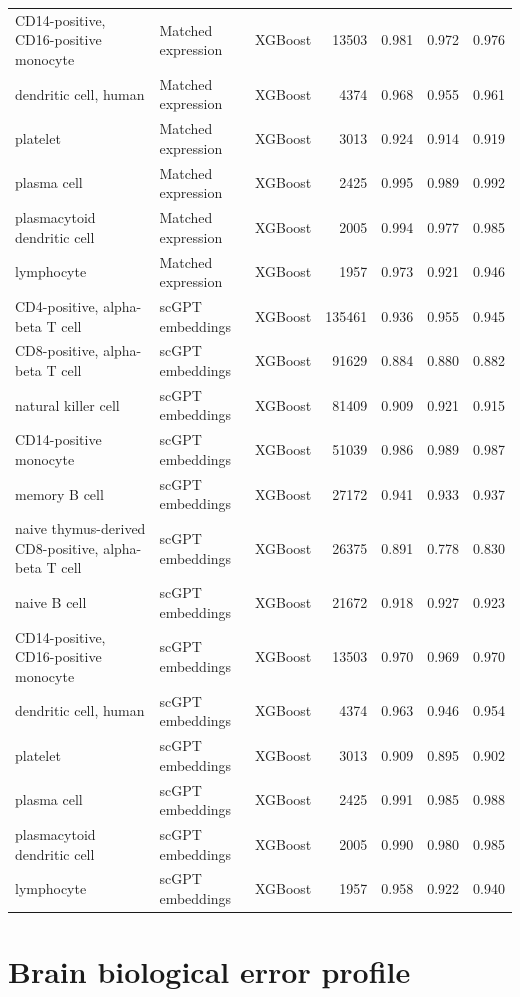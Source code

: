 {\begin{longtable}{>{\raggedright\arraybackslash}p{4.2cm}llrrrr}
CD14-positive, CD16-positive monocyte & Matched expression & XGBoost & 13503 & 0.981 & 0.972 & 0.976 \\
dendritic cell, human & Matched expression & XGBoost & 4374 & 0.968 & 0.955 & 0.961 \\
platelet & Matched expression & XGBoost & 3013 & 0.924 & 0.914 & 0.919 \\
plasma cell & Matched expression & XGBoost & 2425 & 0.995 & 0.989 & 0.992 \\
plasmacytoid dendritic cell & Matched expression & XGBoost & 2005 & 0.994 & 0.977 & 0.985 \\
lymphocyte & Matched expression & XGBoost & 1957 & 0.973 & 0.921 & 0.946 \\
CD4-positive, alpha-beta T cell & scGPT embeddings & XGBoost & 135461 & 0.936 & 0.955 & 0.945 \\
CD8-positive, alpha-beta T cell & scGPT embeddings & XGBoost & 91629 & 0.884 & 0.880 & 0.882 \\
natural killer cell & scGPT embeddings & XGBoost & 81409 & 0.909 & 0.921 & 0.915 \\
CD14-positive monocyte & scGPT embeddings & XGBoost & 51039 & 0.986 & 0.989 & 0.987 \\
memory B cell & scGPT embeddings & XGBoost & 27172 & 0.941 & 0.933 & 0.937 \\
naive thymus-derived CD8-positive, alpha-beta T cell & scGPT embeddings & XGBoost & 26375 & 0.891 & 0.778 & 0.830 \\
naive B cell & scGPT embeddings & XGBoost & 21672 & 0.918 & 0.927 & 0.923 \\
CD14-positive, CD16-positive monocyte & scGPT embeddings & XGBoost & 13503 & 0.970 & 0.969 & 0.970 \\
dendritic cell, human & scGPT embeddings & XGBoost & 4374 & 0.963 & 0.946 & 0.954 \\
platelet & scGPT embeddings & XGBoost & 3013 & 0.909 & 0.895 & 0.902 \\
plasma cell & scGPT embeddings & XGBoost & 2425 & 0.991 & 0.985 & 0.988 \\
plasmacytoid dendritic cell & scGPT embeddings & XGBoost & 2005 & 0.990 & 0.980 & 0.985 \\
lymphocyte & scGPT embeddings & XGBoost & 1957 & 0.958 & 0.922 & 0.940 \\
\end{longtable}
}

\clearpage\section{Brain biological error profile}


